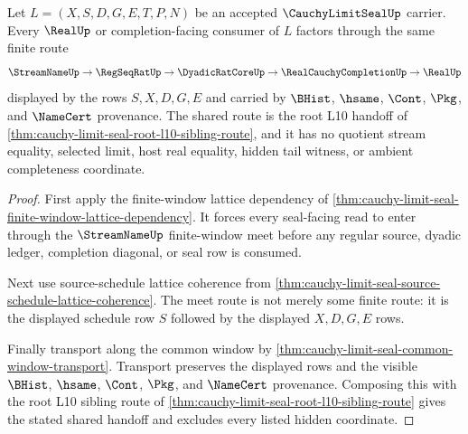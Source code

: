 \begin{theorem}
\label{thm:cauchy-limit-seal-shared-window-route}
Let $L=(X,S,D,G,E,T,P,N)$ be an accepted $\CauchyLimitSealUp$ carrier. Every $\RealUp$ or completion-facing consumer of $L$ factors through the same finite route
$$
\StreamNameUp \to \RegSeqRatUp \to \DyadicRatCoreUp \to \RealCauchyCompletionUp \to \RealUp
$$
displayed by the rows $S,X,D,G,E$ and carried by $\BHist$, $\hsame$, $\Cont$, $\Pkg$, and $\NameCert$ provenance. The shared route is the root L10 handoff of \autoref{thm:cauchy-limit-seal-root-l10-sibling-route}, and it has no quotient stream equality, selected limit, host real equality, hidden tail witness, or ambient completeness coordinate.
\end{theorem}
\begin{proof}
First apply the finite-window lattice dependency of \autoref{thm:cauchy-limit-seal-finite-window-lattice-dependency}. It forces every seal-facing read to enter through the $\StreamNameUp$ finite-window meet before any regular source, dyadic ledger, completion diagonal, or seal row is consumed.

Next use source-schedule lattice coherence from \autoref{thm:cauchy-limit-seal-source-schedule-lattice-coherence}. The meet route is not merely some finite route: it is the displayed schedule row $S$ followed by the displayed $X,D,G,E$ rows.

Finally transport along the common window by \autoref{thm:cauchy-limit-seal-common-window-transport}. Transport preserves the displayed rows and the visible $\BHist$, $\hsame$, $\Cont$, $\Pkg$, and $\NameCert$ provenance. Composing this with the root L10 sibling route of \autoref{thm:cauchy-limit-seal-root-l10-sibling-route} gives the stated shared handoff and excludes every listed hidden coordinate.
\end{proof}

